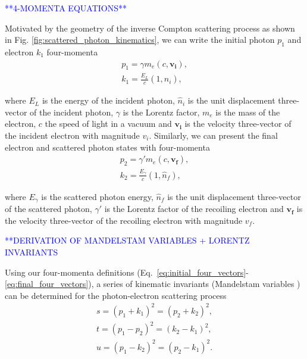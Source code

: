 \documentclass[../main.tex]{subfiles}
\begin{document}
\textcolor{blue}{**4-MOMENTA EQUATIONS**}

Motivated by the geometry of the inverse Compton scattering process as shown in Fig. \ref{fig:scattered_photon_kinematics}, we can write the initial photon $p_{1}$ and electron $k_{1}$ four-momenta
\begin{align}
p_{1} = \gamma m_{e}\left(c,\boldsymbol{v_{i}}\right),
\label{eq:initial_four_vectors} \\
k_{1} = \frac{E_{L}}{c}\left(1,\hat{n}_{i}\right), 
\end{align}

where $E_{L}$ is the energy of the incident photon, $\hat{n}_{i}$ is the unit displacement three-vector of the incident photon, $\gamma$ is the Lorentz factor, $m_{e}$ is the mass of the electron, $c$ the speed of light in a vacuum and $\boldsymbol{v_{i}}$ is the velocity three-vector of the incident electron with magnitude $v_{i}$. Similarly, we can present the final electron and scattered photon states with four-momenta 
\begin{align}
p_{2} = \gamma' m_{e}\left(c,\boldsymbol{v_{f}}\right), \\
k_{2} = \frac{E_{\gamma}}{c}\left(1,\hat{n}_{f}\right), 
\label{eq:final_four_vectors} 
\end{align}

where $E_{\gamma}$ is the scattered photon energy, $\hat{n}_{f}$ is the unit displacement three-vector of the scattered photon, $\gamma'$ is the Lorentz factor of the recoiling electron and $\boldsymbol{v_{f}}$ is the velocity three-vector of the recoiling electron with magnitude $v_{f}$.

\textcolor{blue}{**DERIVATION OF MANDELSTAM VARIABLES + LORENTZ INVARIANTS }

Using our four-momenta definitions (Eq.~\ref{eq:initial_four_vectors}-\ref{eq:final_four_vectors}), a  series of kinematic invariants (Mandelstam variables \cite{mandelstam1958determination}) can be determined for the photon-electron scattering process \cite{berestetskii1982quantum}
\begin{align}
s = \left(p_{1}+k_{1}\right)^{2} = \left(p_{2}+k_{2}\right)^{2},
\label{eq:s_Mandelstam} \\
t = \left(p_{1}-p_{2}\right)^{2} = \left(k_{2}-k_{1}\right)^{2},
\label{eq:t_Mandelstam} \\
u = \left(p_{1}-k_{2}\right)^{2} = \left(p_{2}-k_{1}\right)^{2}.
\label{eq:u_Mandelstam}
\end{align}
\end{document}
